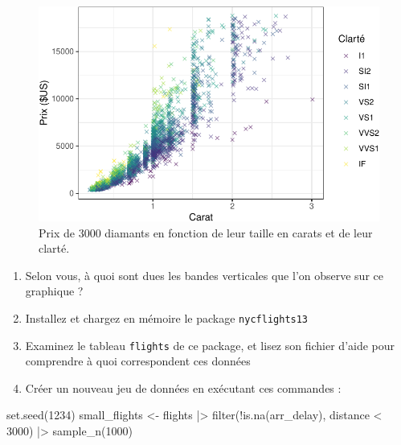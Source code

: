 \documentclass[
  a4paper,
  DIV=11,
  numbers=noendperiod,
  oneside]{scrreprt}
\newenvironment{Shaded}{}{}
\newcommand{\DecValTok}[1]{\textcolor[rgb]{0.00,0.36,0.77}{#1}}
\newcommand{\FunctionTok}[1]{\textcolor[rgb]{0.44,0.26,0.76}{#1}}
\newcommand{\NormalTok}[1]{\textcolor[rgb]{0.14,0.16,0.18}{#1}}
\newcommand{\OtherTok}[1]{\textcolor[rgb]{0.44,0.26,0.76}{#1}}
\newcommand{\SpecialCharTok}[1]{\textcolor[rgb]{0.00,0.36,0.77}{#1}}
\begin{document}
\begin{figure}[H]

{\centering \includegraphics{03-visualization_files/figure-pdf/unnamed-chunk-116-1.pdf}

}

\caption{Prix de 3000 diamants en fonction de leur taille en carats et
de leur clarté.}

\end{figure}%

\begin{enumerate}
\def\labelenumi{\arabic{enumi}.}
\setcounter{enumi}{2}
\item
  Selon vous, à quoi sont dues les bandes verticales que l'on observe
  sur ce graphique ?
\item
  Installez et chargez en mémoire le package \texttt{nycflights13}
\item
  Examinez le tableau \texttt{flights} de ce package, et lisez son
  fichier d'aide pour comprendre à quoi correspondent ces données
\item
  Créer un nouveau jeu de données en exécutant ces commandes :
\end{enumerate}

\begin{Shaded}
\begin{Highlighting}[]
\FunctionTok{set.seed}\NormalTok{(}\DecValTok{1234}\NormalTok{)}
\NormalTok{small\_flights }\OtherTok{\textless{}{-}}\NormalTok{ flights }\SpecialCharTok{|\textgreater{}}
  \FunctionTok{filter}\NormalTok{(}\SpecialCharTok{!}\FunctionTok{is.na}\NormalTok{(arr\_delay),}
\NormalTok{         distance }\SpecialCharTok{\textless{}} \DecValTok{3000}\NormalTok{)  }\SpecialCharTok{|\textgreater{}}
  \FunctionTok{sample\_n}\NormalTok{(}\DecValTok{1000}\NormalTok{)}
\end{Highlighting}
\end{Shaded}
\end{document}
